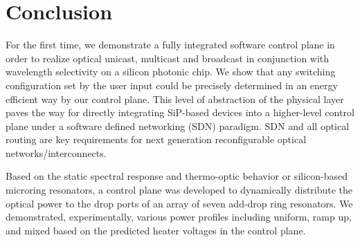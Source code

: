 \section{Conclusion}

For the first time, we demonstrate a fully integrated software control plane in order to realize optical unicast, multicast and broadcast in conjunction with wavelength selectivity on a silicon photonic chip.  We show that any switching configuration set by the user input could be precisely determined in an energy efficient way by our control plane. This level of abstraction of the physical layer paves the way for directly integrating SiP-based devices into a higher-level control plane under a software defined networking (SDN) paradigm. SDN and all optical routing are key requirements for next generation reconfigurable optical networks/interconnects.

Based on the static spectral response and thermo-optic behavior or silicon-based microring resonators, a control plane was developed to dynamically distribute the optical power to the drop ports of an array of seven add-drop ring resonators. We demonstrated, experimentally, various power profiles including uniform, ramp up, and mixed based on the predicted heater voltages in the control plane. 